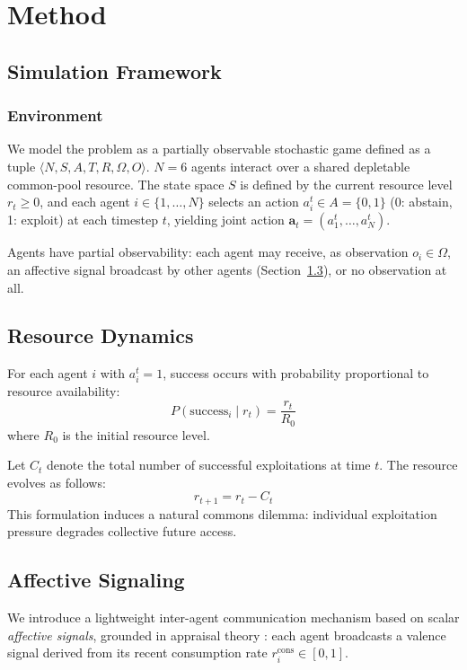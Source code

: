 \section{Method}
\subsection{Simulation Framework}
\subsubsection{Environment}
 
We model the problem as a partially observable stochastic game defined as a tuple
$\langle N, S, A, T, R, \Omega, O \rangle$.
$N = 6$ agents interact over a shared depletable common-pool resource.
The state space $S$ is defined by the current resource level $r_t \geq 0$,
and each agent $i \in \{1, \ldots, N\}$ selects an action
$a_i^t \in A = \{0, 1\}$ (0: abstain, 1: exploit) at each timestep $t$,
yielding joint action $\mathbf{a}_t = (a_1^t, \ldots, a_N^t)$.
 
Agents have partial observability: each agent may receive, as observation
$o_i \in \Omega$, an affective signal broadcast by other agents
(Section~\ref{sec:emotions}), or no observation at all.
 
\subsection{Resource Dynamics}
 
For each agent $i$ with $a_i^t = 1$,
success occurs with probability proportional to resource availability:
\begin{equation}
    P(\text{success}_i \mid r_t) = \frac{r_t}{R_0}
\end{equation}
where $R_0$ is the initial resource level. 

Let $C_t$ denote the total number of successful exploitations at time $t$. The resource evolves as follows:
\begin{equation}
    r_{t+1} =  r_t - C_t
\end{equation}
This formulation induces a natural commons dilemma: individual exploitation pressure
degrades collective future access.
 
\subsection{Affective Signaling}
\label{sec:emotions}


We introduce a lightweight inter-agent communication mechanism based on
scalar \emph{affective signals}, grounded in appraisal theory
\cite{moors2017}: each agent broadcasts a valence signal derived from its
recent consumption rate $r_i^{\text{cons}} \in [0,1]$.

